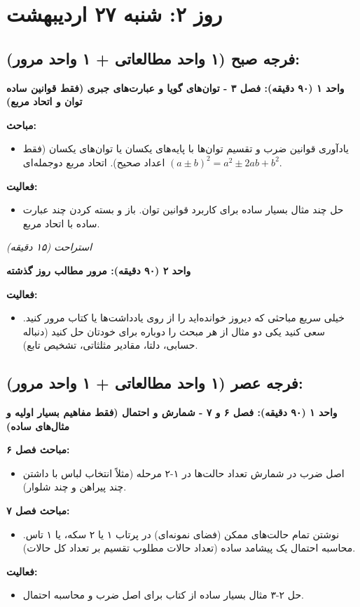 \documentclass[12pt,a4paper]{article}
\newcommand{\studyunit}[1]{\par\medskip\noindent\textbf{#1}\par\nopagebreak}
\newcommand{\topics}{\par\medskip\noindent\textbf{مباحث:}\begin{itemize}[nosep,after=\vspace{-0.5\baselineskip}]}
\newcommand{\activities}{\par\medskip\noindent\textbf{فعالیت:}\begin{itemize}[nosep,after=\vspace{-0.5\baselineskip}]}
\newcommand{\breaktime}[1]{\par\smallskip\centerline{\textit{#1}}\smallskip}
\begin{document}
\section*{روز ۲: شنبه ۲۷ اردیبهشت}

\subsection*{فرجه صبح (۱ واحد مطالعاتی + ۱ واحد مرور):}
    \studyunit{واحد ۱ (۹۰ دقیقه): فصل ۳ - توان‌های گویا و عبارت‌های جبری (فقط قوانین ساده توان و اتحاد مربع)}
        \topics
            \item یادآوری قوانین ضرب و تقسیم توان‌ها با پایه‌های یکسان یا توان‌های یکسان (فقط اعداد صحیح). اتحاد مربع دوجمله‌ای $(a \pm b)^2 = a^2 \pm 2ab + b^2$.
        \end{itemize}
        \activities
            \item حل چند مثال بسیار ساده برای کاربرد قوانین توان. باز و بسته کردن چند عبارت ساده با اتحاد مربع.
        \end{itemize}

    \breaktime{استراحت (۱۵ دقیقه)}

    \studyunit{واحد ۲ (۹۰ دقیقه): مرور مطالب روز گذشته}
        \activities
            \item خیلی سریع مباحثی که دیروز خوانده‌اید را از روی یادداشت‌ها یا کتاب مرور کنید. سعی کنید یکی دو مثال از هر مبحث را دوباره برای خودتان حل کنید (دنباله حسابی، دلتا، مقادیر مثلثاتی، تشخیص تابع).
        \end{itemize}

\subsection*{فرجه عصر (۱ واحد مطالعاتی + ۱ واحد مرور):}
    \studyunit{واحد ۱ (۹۰ دقیقه): فصل ۶ و ۷ - شمارش و احتمال (فقط مفاهیم بسیار اولیه و مثال‌های ساده)}
        \par\medskip\noindent\textbf{مباحث فصل ۶:}
        \begin{itemize}[nosep,after=\vspace{-0.5\baselineskip}]
            \item اصل ضرب در شمارش تعداد حالت‌ها در ۱-۲ مرحله (مثلاً انتخاب لباس با داشتن چند پیراهن و چند شلوار).
        \end{itemize}
        \par\medskip\noindent\textbf{مباحث فصل ۷:}
        \begin{itemize}[nosep,after=\vspace{-0.5\baselineskip}]
            \item نوشتن تمام حالت‌های ممکن (فضای نمونه‌ای) در پرتاب ۱ یا ۲ سکه، یا ۱ تاس. محاسبه احتمال یک پیشامد ساده (تعداد حالات مطلوب تقسیم بر تعداد کل حالات).
        \end{itemize}
        \activities
            \item حل ۲-۳ مثال بسیار ساده از کتاب برای اصل ضرب و محاسبه احتمال.
        \end{itemize}
\end{document}
